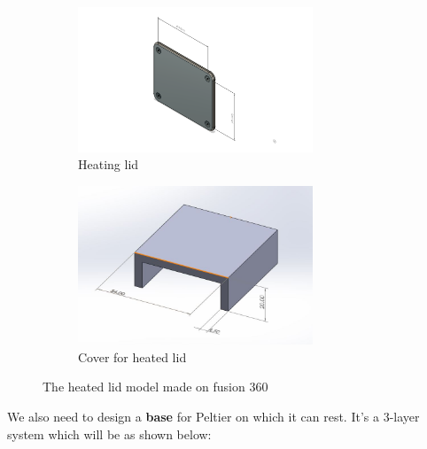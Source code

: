 \documentclass[12pt]{article}
\begin{document}
\begin{figure}[htp]
    \centering
    \begin{subfigure}[b]{0.4\textwidth}
    \centering
    \includegraphics[width=7cm]{Images/Heatedlid1.png}
    \caption{Heating lid}
    \end{subfigure}
    \hfill
    \begin{subfigure}[b]{0.5\textwidth}
    \centering
    \includegraphics[width=7cm]{Images/heatinglid2.jpeg}
    \caption{Cover for heated lid}
    \end{subfigure}
    \caption{The heated lid model made on fusion 360}
    \label{fig:galaxy}
\end{figure}

We also need to design a \textbf{base} for Peltier on which it can rest. It's a 3-layer system which will be as shown below:
\end{document}
